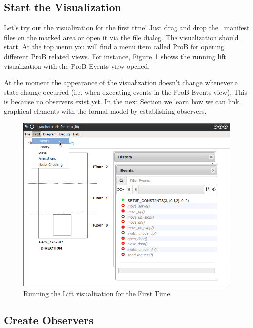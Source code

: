 \subsection{Start the Visualization}
\label{sec:stat_vis}

Let's try out the visualization for the first time!
Just drag and drop the \bms\ manifest files on the marked area or open it via the file dialog.
The visualization should start.
At the top menu you will find a menu item called \textsf{ProB} for opening different ProB related views.
For instance, Figure~\ref{fig_tut_03_running1} shows the running lift visualization with the ProB Events view opened.

At the moment the appearance of the visualization doesn't change whenever a state change occurred (i.e. when executing events in the ProB Events view).
This is because no observers exist yet.
In the next Section we learn how we can link graphical elements with the formal model by establishing observers.

\begin{figure}[!ht]
\begin{center}
	\includegraphics[width=12cm]{img/tutorial/tut_03.png}
	\caption{Running the Lift visualization for the First Time}
	\label{fig_tut_03_running1}
\end{center}
\end{figure}

\subsection{Create Observers}
\label{sec_creation_observers}


